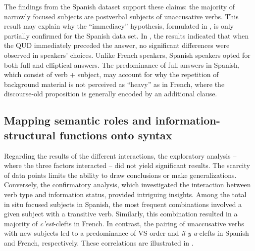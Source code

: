 The findings from the Spanish dataset support these claims: the majority of narrowly focused subjects are postverbal subjects of unaccusative verbs. This result may explain why the ``immediacy” hypothesis, formulated in , is only partially confirmed for the Spanish data set. In , the results indicated that when the QUD immediately preceded the answer, no significant differences were observed in speakers' choices. Unlike French speakers, Spanish speakers opted for both full and elliptical answers. The predominance of full answers in Spanish, which consist of verb + subject, may account for why the repetition of background material is not perceived as ``heavy” as in French, where the discourse-old proposition is generally encoded by an additional clause.

\subsection{Mapping semantic roles and information-structural functions onto syntax} \label{sub:6.10.4}
\largerpage
Regarding the results of the different interactions, the exploratory analysis -- where the three factors interacted -- did not yield significant results. The scarcity of data points limits the ability to draw conclusions or make generalizations. Conversely, the confirmatory analysis, which investigated the interaction between verb type and information status, provided intriguing insights.
Among the total in situ focused subjects in Spanish, the most frequent combinations involved a given subject with a transitive verb. Similarly, this combination resulted in a majority of \textit{c'est}-clefts in French. In contrast, the pairing of unaccusative verbs with new subjects led to a predominance of VS order and \textit{il y a}-clefts in Spanish and French, respectively. These correlations are illustrated in .

